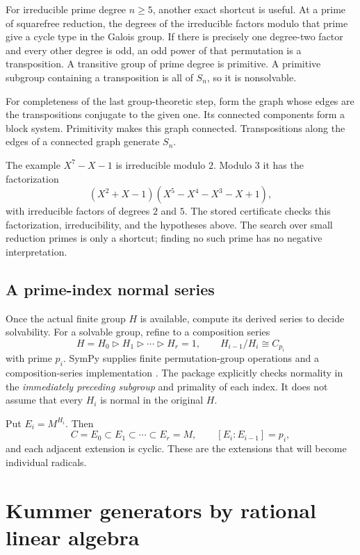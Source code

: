 \documentclass[11pt,letterpaper]{article}
\theoremstyle{definition}\newtheorem{definition}[theorem]{Definition}
\theoremstyle{remark}\newtheorem{remark}[theorem]{Remark}
\begin{document}
For irreducible prime degree $n\geq5$, another exact shortcut is useful. At a prime of squarefree reduction, the degrees of the irreducible factors modulo that prime give a cycle type in the Galois group. If there is precisely one degree-two factor and every other degree is odd, an odd power of that permutation is a transposition. A transitive group of prime degree is primitive. A primitive subgroup containing a transposition is all of $S_n$, so it is nonsolvable.

For completeness of the last group-theoretic step, form the graph whose edges are the transpositions conjugate to the given one. Its connected components form a block system. Primitivity makes this graph connected. Transpositions along the edges of a connected graph generate $S_n$.

The example $X^7-X-1$ is irreducible modulo $2$. Modulo $3$ it has the factorization
\[
 (X^2+X-1)(X^5-X^4-X^3-X+1),
\]
with irreducible factors of degrees $2$ and $5$. The stored certificate checks this factorization, irreducibility, and the hypotheses above. The search over small reduction primes is only a shortcut; finding no such prime has no negative interpretation.

\subsection{A prime-index normal series}
Once the actual finite group $H$ is available, compute its derived series to decide solvability. For a solvable group, refine to a composition series
\begin{equation}\label{eq:series}
 H=H_0\triangleright H_1\triangleright\cdots\triangleright H_r=1,
 \qquad H_{i-1}/H_i\cong C_{p_i}
\end{equation}
with prime $p_i$. SymPy supplies finite permutation-group operations and a composition-series implementation \cite{sympygroups}. The package explicitly checks normality in the \emph{immediately preceding subgroup} and primality of each index. It does not assume that every $H_i$ is normal in the original $H$.

Put $E_i=M^{H_i}$. Then
\[
 C=E_0\subset E_1\subset\cdots\subset E_r=M,
 \qquad [E_i:E_{i-1}]=p_i,
\]
and each adjacent extension is cyclic. These are the extensions that will become individual radicals.

\section{Kummer generators by rational linear algebra}\label{sec:kummer}
\end{document}
